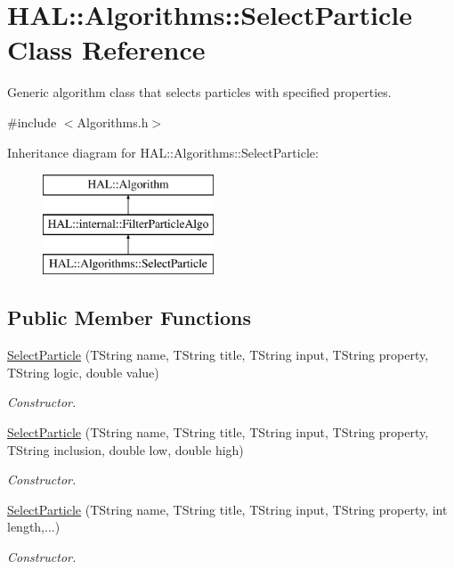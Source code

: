 \hypertarget{class_h_a_l_1_1_algorithms_1_1_select_particle}{\section{H\+A\+L\+:\+:Algorithms\+:\+:Select\+Particle Class Reference}
\label{class_h_a_l_1_1_algorithms_1_1_select_particle}
}


Generic algorithm class that selects particles with specified properties.  




{\ttfamily \#include $<$Algorithms.\+h$>$}

Inheritance diagram for H\+A\+L\+:\+:Algorithms\+:\+:Select\+Particle\+:\begin{figure}[H]
\begin{center}
\leavevmode
\includegraphics[height=3.000000cm]{class_h_a_l_1_1_algorithms_1_1_select_particle}
\end{center}
\end{figure}
\subsection*{Public Member Functions}
\begin{DoxyCompactItemize}
\item 
\hyperlink{class_h_a_l_1_1_algorithms_1_1_select_particle_a54e0c4f2c30c5dadd99c92c2d74ed37c}{Select\+Particle} (T\+String name, T\+String title, T\+String input, T\+String property, T\+String logic, double value)
\begin{DoxyCompactList}\small\item\em Constructor. \end{DoxyCompactList}\item 
\hyperlink{class_h_a_l_1_1_algorithms_1_1_select_particle_a66727ef056247051056804562276ff84}{Select\+Particle} (T\+String name, T\+String title, T\+String input, T\+String property, T\+String inclusion, double low, double high)
\begin{DoxyCompactList}\small\item\em Constructor. \end{DoxyCompactList}\item 
\hyperlink{class_h_a_l_1_1_algorithms_1_1_select_particle_a0eaa8644614c2d1d2db3b79e5c189a9a}{Select\+Particle} (T\+String name, T\+String title, T\+String input, T\+String property, int length,...)
\begin{DoxyCompactList}\small\item\em Constructor. \end{DoxyCompactList}\end{DoxyCompactItemize}
